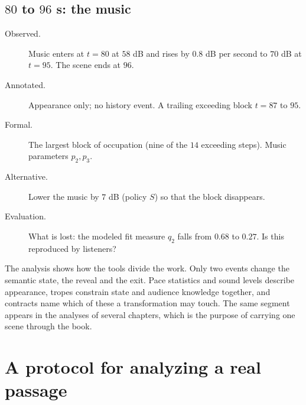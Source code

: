 \subsection*{$80$ to $96$ s: the music}
\begin{description}
\item[Observed.] Music enters at $t=80$ at $58$ dB and rises by $0.8$ dB per second to $70$ dB at $t=95$. The scene ends at $96$.
\item[Annotated.] Appearance only; no history event. A trailing exceeding block $t=87$ to $95$.
\item[Formal.] The largest block of occupation (nine of the $14$ exceeding steps). Music parameters $p_2,p_3$.
\item[Alternative.] Lower the music by $7$ dB (policy $S$) so that the block disappears.
\item[Evaluation.] What is lost: the modeled fit measure $q_2$ falls from $0.68$ to $0.27$. Is this reproduced by listeners?
\end{description}

The analysis shows how the tools divide the work. Only two events change the semantic state, the reveal and the exit. Pace statistics and sound levels describe appearance, tropes constrain state and audience knowledge together, and contracts name which of these a transformation may touch. The same segment appears in the analyses of several chapters, which is the purpose of carrying one scene through the book.

\section{A protocol for analyzing a real passage}\label{sec:protocol}

